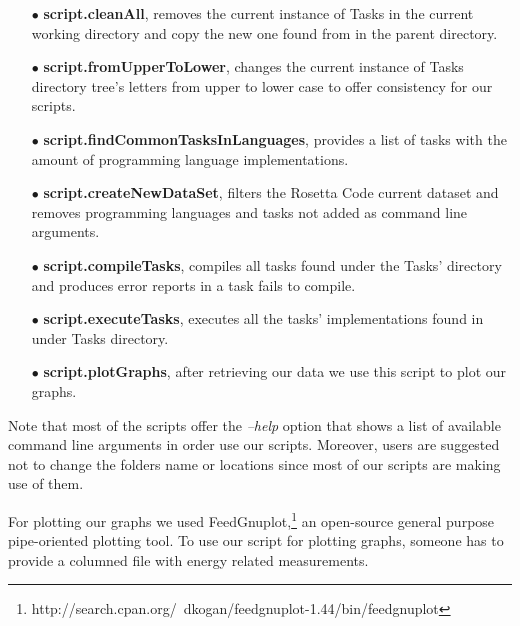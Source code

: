 \begin{enumerate}
	\item [$\bullet$] \textbf{script.cleanAll}, removes the current instance 
	of Tasks in the current working directory and copy the new one found 
	from in the parent directory. 
	\item [$\bullet$] \textbf{script.fromUpperToLower}, changes the current 
	instance of Tasks directory tree's letters from upper to lower 
	case to offer consistency for our scripts. 
	\item [$\bullet$] \textbf{script.findCommonTasksInLanguages}, provides 
	a list of tasks with the amount of programming language implementations.
	\item [$\bullet$] \textbf{script.createNewDataSet}, filters the Rosetta 
	Code current dataset and removes programming languages and tasks not 
	added as command line arguments.
	\item [$\bullet$] \textbf{script.compileTasks}, compiles all tasks found 
	under the Tasks' directory and produces error reports in a task fails to 
	compile.
	\item [$\bullet$] \textbf{script.executeTasks}, executes all the tasks' 
	implementations found in under Tasks directory.
	\item [$\bullet$] \textbf{script.plotGraphs}, after retrieving our data 
	we use this script to plot our graphs.
\end{enumerate}

Note that most of the scripts offer the \textit{--help} option 
that shows a list of available command line arguments in order 
use our scripts.
Moreover, users are suggested not to change the folders name or 
locations since most of our scripts are making use of them. 

For plotting our graphs we used FeedGnuplot,\footnote{http://search.cpan.org/~dkogan/feedgnuplot-1.44/bin/feedgnuplot} 
an open-source general purpose pipe-oriented plotting tool. 
To use our script for plotting graphs, someone has to provide a 
columned file with energy related measurements.

